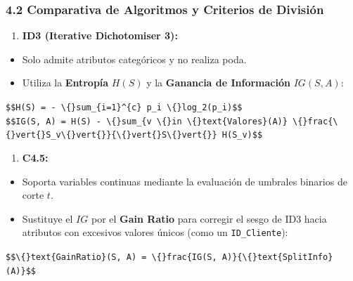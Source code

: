 \documentclass[11pt,oneside]{article}
\begin{document}
\subsubsection{4.2 Comparativa de Algoritmos y Criterios de División}

\begin{enumerate}

\item \textbf{ID3 (Iterative Dichotomiser 3):}

\end{enumerate}

\begin{itemize}

\item Solo admite atributos categóricos y no realiza poda.

\item Utiliza la \textbf{Entropía} \(H(S)\) y la \textbf{Ganancia de Información} \(IG(S, A)\):

\end{itemize}

\texttt{\$\$H(S) = - \textbackslash\{\}sum\_\{i=1\}\textasciicircum{}\{c\} p\_i \textbackslash\{\}log\_2(p\_i)\$\$}\\

\texttt{\$\$IG(S, A) = H(S) - \textbackslash\{\}sum\_\{v \textbackslash\{\}in \textbackslash\{\}text\{Valores\}(A)\} \textbackslash\{\}frac\{\textbackslash\{\}vert\{\}S\_v\textbackslash\{\}vert\{\}\}\{\textbackslash\{\}vert\{\}S\textbackslash\{\}vert\{\}\} H(S\_v)\$\$}\\

\begin{enumerate}

\item \textbf{C4.5:}

\end{enumerate}

\begin{itemize}

\item Soporta variables continuas mediante la evaluación de umbrales binarios de corte \(t\).

\item Sustituye el \(IG\) por el \textbf{Gain Ratio} para corregir el sesgo de ID3 hacia atributos con excesivos valores únicos (como un \texttt{ID\_Cliente}):

\end{itemize}

\texttt{\$\$\textbackslash\{\}text\{GainRatio\}(S, A) = \textbackslash\{\}frac\{IG(S, A)\}\{\textbackslash\{\}text\{SplitInfo\}(A)\}\$\$}\\
\end{document}
